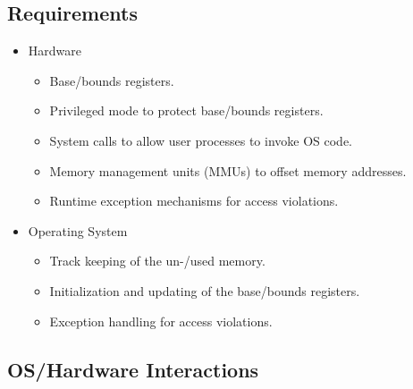 		\subsection{Requirements}
			\begin{itemize}
				\item Hardware
					\begin{itemize}
						\item Base/bounds registers.
						\item Privileged mode to protect base/bounds registers.
						\item System calls to allow user processes to invoke OS code.
						\item Memory management units (MMUs) to offset memory addresses.
						\item Runtime exception mechanisms for access violations.
					\end{itemize}
				\item Operating System
					\begin{itemize}
						\item Track keeping of the un-/used memory.
						\item Initialization and updating of the base/bounds registers.
						\item Exception handling for access violations.
					\end{itemize}
			\end{itemize}

		\subsection{OS/Hardware Interactions}
